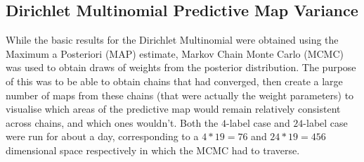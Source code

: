 \subsection{Dirichlet Multinomial Predictive Map Variance}

While the basic results for the Dirichlet Multinomial were obtained using the Maximum a Posteriori (MAP) estimate, Markov Chain Monte Carlo (MCMC) was used to obtain draws of weights from the posterior distribution. The purpose of this was to be able to obtain chains that had converged, then create a large number of maps from these chains (that were actually the weight parameters) to visualise which areas of the predictive map would remain relatively consistent across chains, and which ones wouldn't. Both the $4$-label case and $24$-label case were run for about a day, corresponding to a $4*19=76$ and $24*19=456$ dimensional space respectively in which the MCMC had to traverse.



